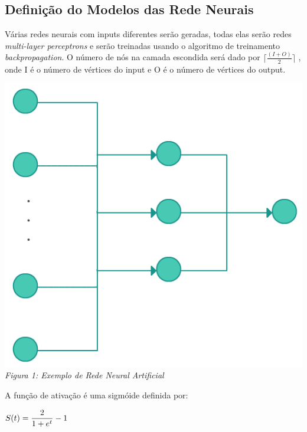 \documentclass[12pt]{article}
\newcommand\ceil[1]{\lceil#1\rceil}
\begin{document}
\subsection{Definição do Modelos das Rede Neurais}

Várias redes neurais com inputs diferentes serão geradas, todas elas serão redes \emph{multi-layer perceptrons} e serão treinadas usando o algoritmo de treinamento \emph{backpropagation}. O número de nós na camada escondida será dado por $\ceil{\frac{(I+O)}{2}}$ , onde I é o número de vértices do input e O é o número de vértices do output.

\begin{center}
\includegraphics[scale=0.45]{gg}\\
\emph{Figura 1: Exemplo de Rede Neural Artificial}\\
\end{center}

A função de ativação é uma sigmóide definida por: \\
\begin{center}
$\mathlarger{S(t) = \frac{2}{1+e^t}-1}$
\end{center}
\end{document}
